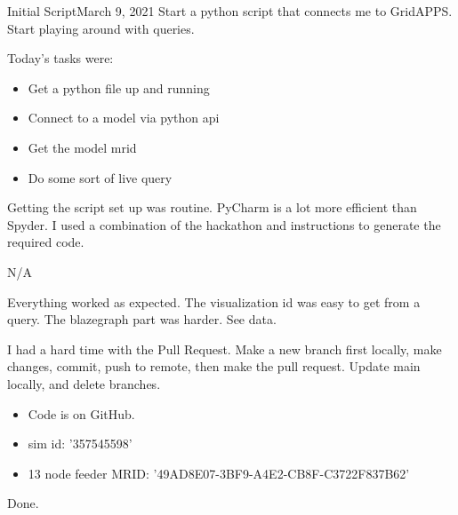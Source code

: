 
\begin{entry}{Initial Script}{March 9, 2021}
    \objective
    Start a python script that connects me to GridAPPS. Start playing around with queries.

    \outline

    Today's tasks were:
        \begin{itemize}
            \item Get a python file up and running
            \item Connect to a model via python api
            \item Get the model mrid
            \item Do some sort of live query
        \end{itemize}

    \procedures

        Getting the script set up was routine. PyCharm is a lot more efficient than Spyder.
        I used a combination of the hackathon and instructions to generate the required code.

    \parameters

    N/A

    \observations

        Everything worked as expected. The visualization id was easy to get from a query. The
        blazegraph part was harder. See data.

        I had a hard time with the Pull Request. Make a new branch first locally, make changes, commit, push to remote,
        then make the pull request. Update main locally, and delete branches.

    \data
    \begin{itemize}
        \item Code is on GitHub.
        \item sim id: '357545598'
        \item 13 node feeder MRID: '\textunderscore49AD8E07-3BF9-A4E2-CB8F-C3722F837B62'
    \end{itemize}




    \results

    Done.

\end{entry}